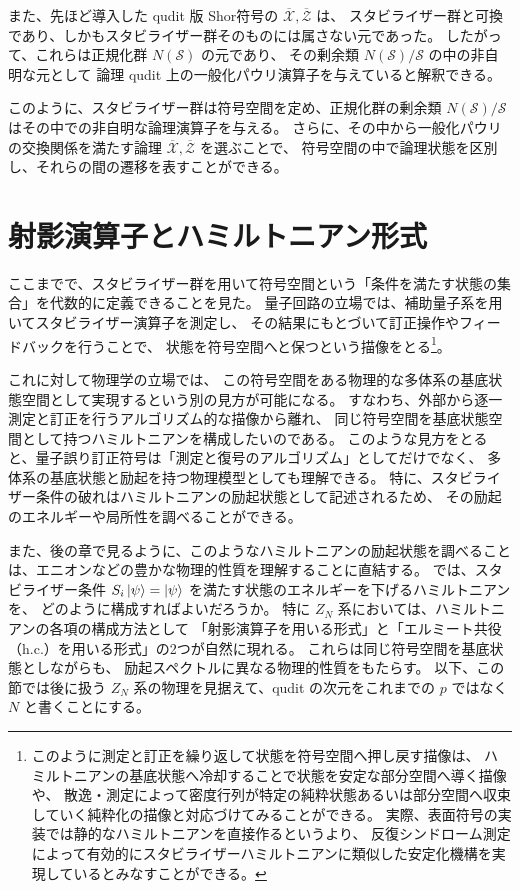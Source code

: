 \documentclass[../master.tex]{subfiles}
\begin{document}
また、先ほど導入した qudit 版 Shor符号の $\overline{\mathcal{X}},\overline{\mathcal{Z}}$ は、
スタビライザー群と可換であり、しかもスタビライザー群そのものには属さない元であった。
したがって、これらは正規化群 $N(\mathcal{S})$ の元であり、
その剰余類 $N(\mathcal{S})/\mathcal{S}$ の中の非自明な元として
論理 qudit 上の一般化パウリ演算子を与えていると解釈できる。

このように、スタビライザー群は符号空間を定め、正規化群の剰余類 $N(\mathcal{S})/\mathcal{S}$ はその中での非自明な論理演算子を与える。
さらに、その中から一般化パウリの交換関係を満たす論理 $\overline{\mathcal{X}},\overline{\mathcal{Z}}$ を選ぶことで、
符号空間の中で論理状態を区別し、それらの間の遷移を表すことができる。

\section{射影演算子とハミルトニアン形式}
ここまでで、スタビライザー群を用いて符号空間という「条件を満たす状態の集合」を代数的に定義できることを見た。
量子回路の立場では、補助量子系を用いてスタビライザー演算子を測定し、
その結果にもとづいて訂正操作やフィードバックを行うことで、
状態を符号空間へと保つという描像をとる\footnote{このように測定と訂正を繰り返して状態を符号空間へ押し戻す描像は、
ハミルトニアンの基底状態へ冷却することで状態を安定な部分空間へ導く描像や、
散逸・測定によって密度行列が特定の純粋状態あるいは部分空間へ収束していく純粋化の描像と対応づけてみることができる。
実際、表面符号の実装では静的なハミルトニアンを直接作るというより、
反復シンドローム測定によって有効的にスタビライザーハミルトニアンに類似した安定化機構を実現しているとみなすことができる。}。

これに対して物理学の立場では、
この符号空間をある物理的な多体系の基底状態空間として実現するという別の見方が可能になる。
すなわち、外部から逐一測定と訂正を行うアルゴリズム的な描像から離れ、
同じ符号空間を基底状態空間として持つハミルトニアンを構成したいのである。
このような見方をとると、量子誤り訂正符号は「測定と復号のアルゴリズム」としてだけでなく、
多体系の基底状態と励起を持つ物理模型としても理解できる。
特に、スタビライザー条件の破れはハミルトニアンの励起状態として記述されるため、
その励起のエネルギーや局所性を調べることができる。

また、後の章で見るように、このようなハミルトニアンの励起状態を調べることは、エニオンなどの豊かな物理的性質を理解することに直結する。
では、スタビライザー条件 $S_i \ket{\psi} = \ket{\psi}$ を満たす状態のエネルギーを下げるハミルトニアンを、
どのように構成すればよいだろうか。
特に $Z_N$ 系においては、ハミルトニアンの各項の構成方法として
「射影演算子を用いる形式」と「エルミート共役（$\mathrm{h.c.}$）を用いる形式」の2つが自然に現れる。
これらは同じ符号空間を基底状態としながらも、
励起スペクトルに異なる物理的性質をもたらす。
以下、この節では後に扱う $Z_N$ 系の物理を見据えて、qudit の次元をこれまでの $p$ ではなく $N$ と書くことにする。
\end{document}
